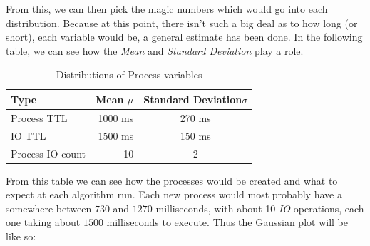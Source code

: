 \documentclass{article}
\newcommand{\code}[1]{\codeinline{\texttt{#1}}}
\begin{document}
From this, we can then pick the magic numbers which would go into each distribution. Because at this point, there isn't such a big deal as to how long (or short), each variable would be, a general estimate has been done. In the following table, we can see how the \textit{Mean} and \textit{Standard Deviation} play a role.

\begin{table}[H]
  \begin{center}
    \label{tab:Distributions of Process variables}
    \begin{tabular}{l|r|c}
      \toprule
       \textbf{Type} & \textbf{Mean $\mu$} & \textbf{Standard Deviation$\sigma$} \\
      \midrule
      Process TTL & 1000 ms & 270 ms \\
      IO TTL & 1500 ms & 150 ms \\
      Process-IO count & 10 & 2 \\
      \bottomrule
    \end{tabular}
    \caption{Distributions of Process variables}
  \end{center}
\end{table}

From this table we can see how the processes would be created and what to expect at each algorithm run. Each new process would most probably have a \code{time\_to\_live} somewhere between $730$ and $1270$ milliseconds, with about 10 \textit{IO} operations, each one taking about $1500$ milliseconds to execute. Thus the Gaussian plot will be like so:

\end{document}

